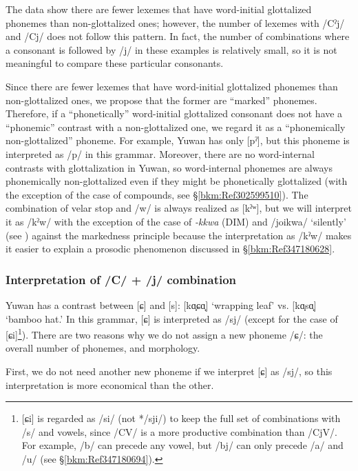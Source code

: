The data show there are fewer lexemes that have word-initial glottalized phonemes than non-glottalized ones; however, the number of lexemes with /Cˀj/ and /Cj/ does not follow this pattern. In fact, the number of combinations where a consonant is followed by /j/ in these examples is relatively small, so it is not meaningful to compare these particular consonants.

Since there are fewer lexemes that have word-initial glottalized phonemes than non-glottalized ones, we propose that the former are “marked” phonemes. Therefore, if a “phonetically” word-initial glottalized consonant does not have a “phonemic” contrast with a non-glottalized one, we regard it as a “phonemically non-glottalized” phoneme. For example, Yuwan has only [pˀ], but this phoneme is interpreted as /p/ in this grammar. Moreover, there are no word-internal contrasts with glottalization in Yuwan, so word-internal phonemes are always phonemically non-glottalized even if they might be phonetically glottalized (with the exception of the case of compounds, see §\ref{bkm:Ref302599510}). The combination of velar stop and /w/ is always realized as [kˀʷ], but we will interpret it as /kˀw/ with the exception of the case of \textit{{}-kkwa} (DIM) and /joikwa/ ‘silently’ (see ) against the markedness principle because the interpretation as /kˀw/ makes it easier to explain a prosodic phenomenon discussed in §\ref{bkm:Ref347180628}.

\subsubsection{Interpretation of /C/ + /j/ combination}
\label{bkm:Ref347180720}\hypertarget{RefHeadingToc395696975}{}
Yuwan has a contrast between [ɕ] and [s]: [kɑ̟ɕɑ̟] ‘wrapping leaf’ vs. [kɑ̟sɑ̟] ‘bamboo hat.’ In this grammar, [ɕ] is interpreted as /sj/ (except for the case of [ɕi]\footnote{[ɕi] is regarded as /si/ (not */sji/) to keep the full set of combinations with /s/ and vowels, since /CV/ is a more productive combination than /CjV/. For example, /b/ can precede any vowel, but /bj/ can only precede /a/ and /u/ (see §\ref{bkm:Ref347180694}).}). There are two reasons why we do not assign a new phoneme /ɕ/:  the overall number of phonemes, and  morphology.

First, we do not need another new phoneme if we interpret [ɕ] as /sj/, so this interpretation is more economical than the other.

